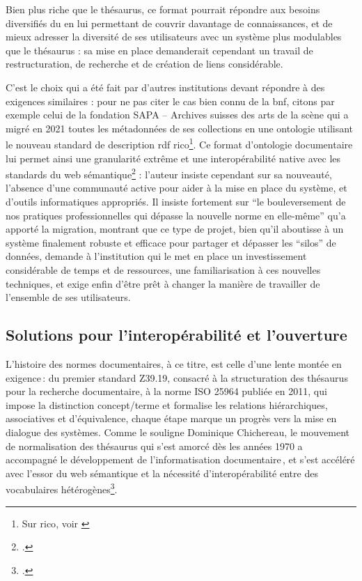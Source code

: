 Bien plus riche que le thésaurus, ce format pourrait répondre aux besoins diversifiés du \mae en lui permettant de couvrir davantage de connaissances, et de mieux adresser la diversité de ses utilisateurs avec un système plus modulables que le thésaurus : sa mise en place demanderait cependant un travail de restructuration, de recherche et de création de liens considérable.

C'est le choix qui a été fait par d'autres institutions devant répondre à des exigences similaires : pour ne pas citer le cas bien connu de la \ac{bnf}, citons par exemple celui de la fondation SAPA -- Archives suisses des arts de la scène qui a migré en 2021 toutes les métadonnées de ses collections en une ontologie utilisant le nouveau standard de description \ac{rdf} \ac{rico}\footnote{Sur \ac{rico}, voir \cite{bruleauxRecordsContextsRIC2024}}. Ce format d'ontologie documentaire lui permet ainsi une granularité extrême et une interopérabilité native avec les standards du web sémantique\footcite{coulonDeploiementNormeRecords2024} : l'auteur insiste cependant sur sa nouveauté, l'absence d'une communauté active pour aider à la mise en place du système, et d'outils informatiques appropriés. Il insiste fortement sur \enquote{le bouleversement de nos pratiques professionnelles qui dépasse la nouvelle norme en elle-même} qu'a apporté la migration, montrant que ce type de projet, bien qu'il aboutisse à un système finalement robuste et efficace pour partager et dépasser les \enquote{silos} de données, demande à l'institution qui le met en place un investissement considérable de temps et de ressources, une familiarisation à ces nouvelles techniques, et exige enfin d'être prêt à changer la manière de travailler de l'ensemble de ses utilisateurs.

\subsection{Solutions pour l’interopérabilité et l’ouverture}

L’histoire des normes documentaires, à ce titre, est celle d’une lente montée en exigence : du premier standard Z39.19, consacré à la structuration des thésaurus pour la recherche documentaire, à la norme ISO 25964 publiée en 2011, qui impose la distinction concept/terme et formalise les relations hiérarchiques, associatives et d’équivalence, chaque étape marque un progrès vers la mise en dialogue des systèmes. Comme le souligne Dominique Chichereau, le mouvement de normalisation des thésaurus qui s'est amorcé dès les années 1970 a accompagné le développement de l’informatisation documentaire , et s’est accéléré avec l’essor du web sémantique et la nécessité d'interopérabilité entre des vocabulaires hétérogènes\footcite{chichereauNormesConceptionGestion2007}.

